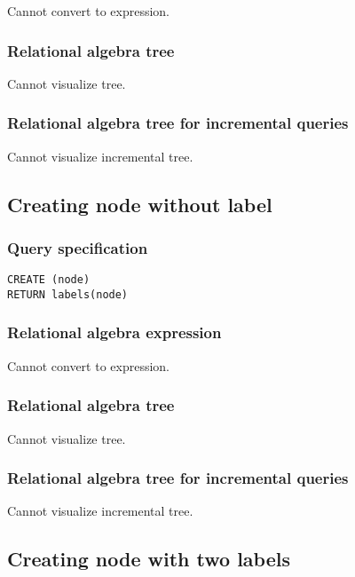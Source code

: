Cannot convert to expression.

\subsubsection*{Relational algebra tree}

Cannot visualize tree.

\subsubsection*{Relational algebra tree for incremental queries}

Cannot visualize incremental tree.

\subsection{Creating node without label}

\subsubsection*{Query specification}

\begin{lstlisting}
CREATE (node)
RETURN labels(node)
\end{lstlisting}

\subsubsection*{Relational algebra expression}

Cannot convert to expression.

\subsubsection*{Relational algebra tree}

Cannot visualize tree.

\subsubsection*{Relational algebra tree for incremental queries}

Cannot visualize incremental tree.

\subsection{Creating node with two labels}

